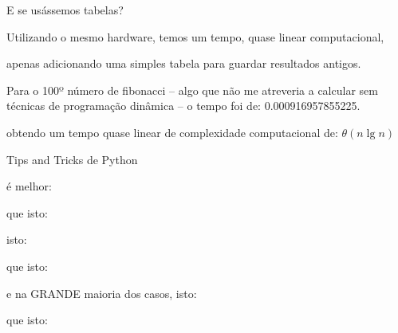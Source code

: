 \documentclass{beamer}
\begin{document}
  \begin{frame}{E se usássemos tabelas?}
    
  \end{frame}
  \begin{frame}
    \begin{block}
       Utilizando o mesmo hardware, temos um tempo, quase linear computacional, 
       
       apenas adicionando uma simples tabela para guardar resultados antigos.

       Para o 100º número de fibonacci 
        -- algo que não me atreveria a calcular sem técnicas de programação dinâmica -- 
        o tempo foi de:  0.000916957855225.

    \end{block}
    obtendo um tempo quase linear de complexidade computacional de:
    $\theta(n \lg n)$

  \end{frame}
  \begin{frame}{Tips and Tricks de Python}

  é melhor:

  

  que isto:

  
  \end{frame}
  \begin{frame}
  isto:
  

  que isto:

  

  \end{frame}
  \begin{frame}

  e na GRANDE maioria dos casos, isto:

  

  que isto:

  

  \end{frame}
\end{document}
